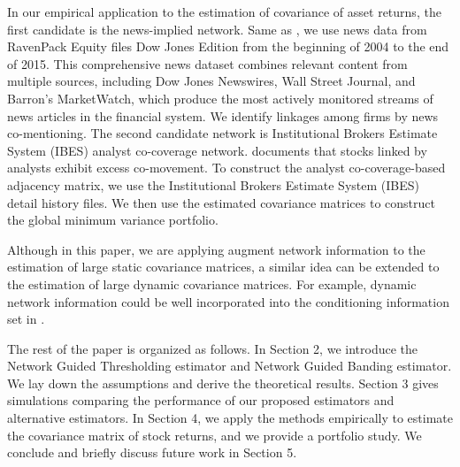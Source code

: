 In our empirical application to the estimation of covariance of asset returns, the first candidate is the news-implied network. Same as \cite{ge2022news}, we use news data from RavenPack Equity files Dow Jones Edition from the beginning of 2004 to the end of 2015. This comprehensive news dataset combines relevant content from multiple sources, including Dow Jones Newswires, Wall Street Journal, and Barron’s  MarketWatch, which produce the most actively monitored streams of news articles in the financial system. We identify linkages among firms by news co-mentioning. The second candidate network is Institutional Brokers Estimate System (IBES) analyst co-coverage network. \cite{israelsen2016does} documents that stocks linked by analysts exhibit excess co-movement. To construct the analyst co-coverage-based adjacency matrix, we use the Institutional Brokers Estimate System (IBES) detail history files.  We then use the estimated covariance matrices to construct the global minimum variance portfolio.

Although in this paper, we are applying augment network information to the estimation of large static covariance matrices, a similar idea can be extended to the estimation of large dynamic covariance matrices. For example, dynamic network information could be well incorporated into the conditioning information set in \cite{chen2019new}.


The rest of the paper is organized as follows. In Section 2, we introduce the Network Guided Thresholding estimator and Network Guided Banding estimator. We lay down the assumptions and derive the theoretical results. Section 3 gives simulations comparing the performance of our proposed estimators and alternative estimators. In Section 4, we apply the methods empirically to estimate the covariance matrix of stock returns, and we provide a portfolio study. We conclude and briefly discuss future work in Section 5.